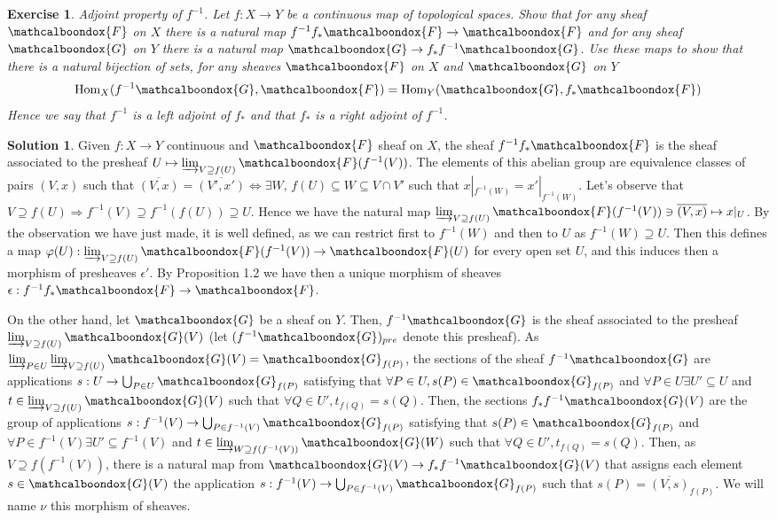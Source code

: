 \documentclass[12pt]{article}
\newcommand{\imp}{\ensuremath{\Rightarrow}}
\newtheorem{ex}{Exercise}[section]
\theoremstyle{definition}
\newtheorem*{sol}{Solution}
\newcommand{\sF}{\ensuremath{\mathcalboondox{F}}}
\newcommand{\sG}{\ensuremath{\mathcalboondox{G}}}
\begin{document}
\begin{ex}
	Adjoint property of $f^{-1}$. Let $f: X \to Y$ be a continuous map of topological spaces. Show that for any sheaf $\sF$ on $X$ there is a natural map $f^{-1}f_{*}\sF \to \sF$ and for any sheaf $\sG$ on $Y$ there is a natural map $\sG \to f_{*}f^{-1}\sG$. Use these maps to show that there is a natural bijection of sets, for any sheaves $\sF$ on $X$ and $\sG$ on $Y$
	\[
		\mathrm{Hom}_X(f^{-1}\sG, \sF) = \mathrm{Hom}_Y(\sG, f_{*}\sF)
	\]
	Hence we say that $f^{-1}$ is a left adjoint of $f_{*}$ and that $f_{*}$ is a right adjoint of $f^{-1}$.
\end{ex}

\begin{sol}
	Given $f:X \to Y$ continuous and $\sF$ sheaf on $X$, the sheaf $f^{-1}f_{*}\sF$ is the sheaf associated to the presheaf $U \mapsto \varinjlim_{V \supseteq f(U)} \sF(f^{-1}(V))$. The elements of this abelian group are equivalence classes of pairs $(V,x)$ such that $\overline{(V,x)} = \overline{(V',x')} \iff \exists W, \, f(U) \subseteq W \subseteq V \cap V'$ such that $x|_{f^{-1}(W)} = x'|_{f^{-1}(W)}$. Let's observe that $V \supseteq f(U) \imp f^{-1}(V) \supseteq f^{-1}(f(U)) \supseteq U$. Hence we have the natural map $\varinjlim_{V \supseteq f(U)} \sF(f^{-1}(V)) \ni \overline{(V,x)} \mapsto x|_U$. By the observation we have just made, it is well defined, as we can restrict first to $f^{-1}(W)$ and then to $U$ as $f^{-1}(W) \supseteq U$. Then this defines a map $\varphi(U): \varinjlim_{V \supseteq f(U)} \sF(f^{-1}(V)) \to \sF(U)$ for every open set $U$, and this induces then a morphism of presheaves $\epsilon'$. By Proposition 1.2 we have then a unique morphism of sheaves $\epsilon: f^{-1}f_{*}\sF \to \sF$.

	On the other hand, let $\sG$ be a sheaf on $Y$. Then, $f^{-1}\sG$ is the sheaf associated to the presheaf $\varinjlim_{V \supseteq f(U)} \sG(V)$ (let $(f^{-1}\sG)_{pre}$ denote this presheaf). As $\varinjlim_{P \in U} \varinjlim_{V \supseteq f(U)} \sG(V) = \sG_{f(P)}$, the sections of the sheaf $f^{-1}\sG$ are applications $s: U \to \bigcup_{P \in U} \sG_{f(P)}$ satisfying that $\forall P \in U, s(P) \in \sG_{f(P)}$ and $\forall P \in U \exists U' \subseteq U$ and $t \in \varinjlim_{V \supseteq f(U)} \sG(V)$ such that $\forall Q \in U', t_{f(Q)} = s(Q)$. Then, the sections $f_{*}f^{-1}\sG(V)$ are the group of applications $s: f^{-1}(V) \to \bigcup_{P \in f^{-1}(V)} \sG_{f(P)}$ satisfying that $s(P) \in \sG_{f(P)}$ and $\forall P \in f^{-1}(V) \exists U' \subseteq f^{-1}(V)$ and $t \in \varinjlim_{W \supseteq f(f^{-1}(V))} \sG(W)$ such that $\forall Q \in U', t_{f(Q)} = s(Q)$. Then, as $V \supseteq f(f^{-1}(V))$, there is a natural map from $\sG(V) \to f_{*}f^{-1}\sG(V)$ that assigns each element $s \in \sG(V)$ the application $s: f^{-1}(V) \to \bigcup_{P \in f^{-1}(V)} \sG_{f(P)}$ such that $s(P) = \overline{(V,s)}_{f(P)}$. We will name $\nu$ this morphism of sheaves.


\end{sol}
\end{document}
